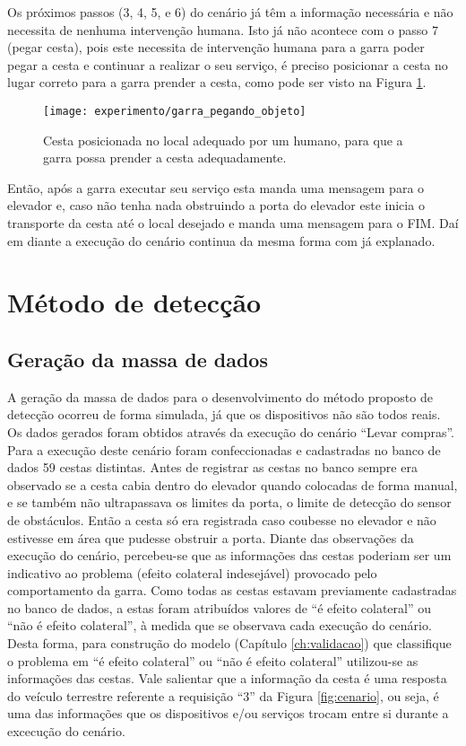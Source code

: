 Os próximos passos (3, 4, 5, e 6) do cenário já têm a informação necessária e não necessita de nenhuma intervenção humana. Isto já não acontece com o passo 7 (pegar cesta), pois este necessita de intervenção humana para a garra poder pegar a cesta e continuar a realizar o seu serviço, é preciso posicionar a cesta no lugar correto para a garra prender a cesta, como pode ser visto na Figura \ref{fig:garra_pegando_objeto}. \begin{figure}[!htb] \centering 
  \centering
  \texttt{[image: experimento/garra\_pegando\_objeto]} 
  \caption{Cesta posicionada no local adequado por um humano, para que a garra possa prender a cesta adequadamente.} 
  \label{fig:garra_pegando_objeto}
\end{figure} Então, após a garra executar seu serviço esta manda uma mensagem para o elevador e, caso não tenha nada obstruindo a porta do elevador este inicia o transporte da cesta até o local desejado e manda uma mensagem para o FIM. Daí em diante a execução do cenário continua da mesma forma com já explanado.

\section{Método de detecção}
\subsection{Geração da massa de dados}
\label{subsec:geracaodados}
A geração da massa de dados para o desenvolvimento do método proposto de detecção ocorreu de forma simulada, já que os dispositivos não são todos reais. Os dados gerados foram obtidos através da execução do cenário ``Levar compras''. Para a execução deste cenário foram confeccionadas e cadastradas no banco de dados 59 cestas distintas. Antes de registrar as cestas no banco sempre era observado se a cesta cabia dentro do elevador quando colocadas de forma manual, e se também não ultrapassava os limites da porta, o limite de detecção do sensor de obstáculos. Então a cesta só era registrada caso coubesse no elevador e não estivesse em área que pudesse obstruir a porta. Diante das observações da execução do cenário, percebeu-se que as informações das cestas poderiam ser um indicativo ao problema (efeito colateral indesejável) provocado pelo comportamento da garra. Como todas as cestas estavam previamente cadastradas no banco de dados, a estas foram atribuídos valores de ``é efeito colateral'' ou ``não é efeito colateral'', à medida que se observava cada execução do cenário. Desta forma, para construção do modelo (Capítulo \ref{ch:validacao}) que classifique o problema em ``é efeito colateral'' ou ``não é efeito colateral'' utilizou-se as informações das cestas. Vale salientar que a informação da cesta é uma resposta do veículo terrestre referente a requisição ``3'' da Figura \ref{fig:cenario}, ou seja, é uma das informações que os dispositivos e/ou serviços trocam entre si durante a excecução do cenário.

